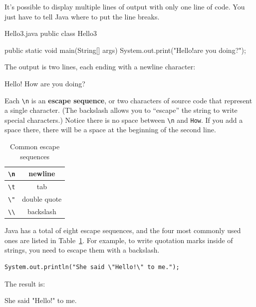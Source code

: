 It's possible to display multiple lines of output with only one line of code.
You just have to tell Java where to put the line breaks.

\begin{trinket}[220]{Hello3.java}
public class Hello3 {

    public static void main(String[] args) {
        System.out.print("Hello!\nHow are you doing?\n");
    }
}
\end{trinket}

The output is two lines, each ending with a newline character:

\begin{stdout}
Hello!
How are you doing?
\end{stdout}


Each \verb"\n" is an {\bf escape sequence}, or two characters of source code that represent a single character.
(The backslash allows you to ``escape'' the string to write special characters.)
Notice there is no space between \verb"\n" and \verb"How".
If you add a space there, there will be a space at the beginning of the second line.

\begin{table}[!ht]
\begin{center}
\begin{tabular}{|c|c|}
\hline
\verb"\n" & newline \\
\hline
\verb"\t" & tab \\
\hline
\verb'\"' & double quote \\
\hline
\verb"\\" & backslash \\
\hline
\end{tabular}
\caption{Common escape sequences}
\label{tab:escape}
\end{center}
\end{table}

Java has a total of eight escape sequences, and the four most commonly used ones are listed in Table~\ref{tab:escape}.
For example, to write quotation marks inside of strings, you need to escape them with a backslash.

\begin{verbatim}
System.out.println("She said \"Hello!\" to me.");
\end{verbatim}

The result is:

\begin{stdout}
She said "Hello!" to me.
\end{stdout}


